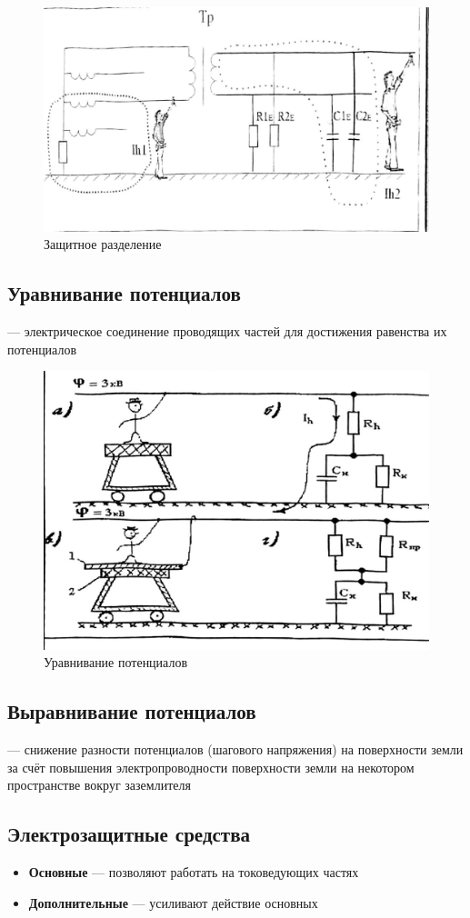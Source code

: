 \documentclass[a4paper, 14pt]{extarticle}
\begin{document}
\begin{figure}[h]
    \centering
    \includegraphics[width=\textwidth]{./img/L5/S007.jpg}
    \caption{Защитное разделение}
\end{figure}

\subsection{Уравнивание потенциалов}
 --- электрическое соединение проводящих частей для достижения равенства их потенциалов

\begin{figure}[h]
    \centering
    \includegraphics[width=\textwidth]{./img/L5/S008.jpg}
    \caption{Уравнивание потенциалов}
\end{figure}

\subsection{Выравнивание потенциалов}
 --- снижение разности потенциалов (шагового напряжения) на поверхности земли за счёт повышения электропроводности поверхности земли на некотором пространстве вокруг заземлителя

\subsection{Электрозащитные средства}
\begin{itemize}
    \item \textbf{Основные} --- позволяют работать на токоведующих частях
    \item \textbf{Дополнительные} --- усиливают действие основных
\end{itemize}
\end{document}
